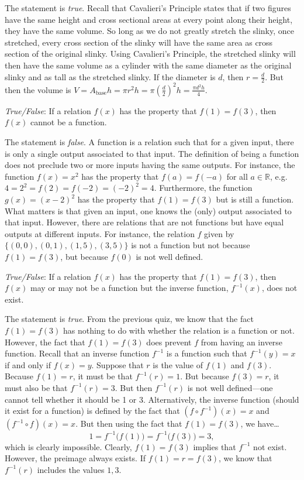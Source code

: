\documentclass[11pt,letterpaper]{article}
\begin{document}
\sol The statement is \textit{true}. Recall that Cavalieri's Principle states that if two figures have the same height and cross sectional areas at every point along their height, they have the same volume. So long as we do not greatly stretch the slinky, once stretched, every cross section of the slinky will have the same area as cross section of the original slinky. Using Cavalieri's Principle, the stretched slinky will then have the same volume as a cylinder with the same diameter as the original slinky and as tall as the stretched slinky. If the diameter is $d$, then $r= \frac{d}{2}$. But then the volume is $V= A_{\text{base}} h= \pi r^2h= \pi \left( \frac{d}{2} \right)^2 h= \frac{\pi d^2 h}{4}$. \pvspace{1.3cm}



\quizsol \textit{True/False}: If a relation $f(x)$ has the property that $f(1)= f(3)$, then $f(x)$ cannot be a function. \pspace

\sol The statement is \textit{false}. A function is a relation such that for a given input, there is only a single output associated to that input. The definition of being a function does not preclude two or more inputs having the same outputs. For instance, the function $f(x)= x^2$ has the property that $f(a)= f(-a)$ for all $a \in \mathbb{R}$, e.g. $4= 2^2= f(2)= f(-2)= (-2)^2= 4$. Furthermore, the function $g(x)= (x - 2)^2$ has the property that $f(1)= f(3)$ but is still a function. What matters is that given an input, one knows the (only) output associated to that input. However, there are relations that are not functions but have equal outputs at different inputs. For instance, the relation $f$ given by $\{ (0, 0), (0, 1), (1, 5), (3, 5) \}$ is not a function but not because $f(1)= f(3)$, but because $f(0)$ is not well defined. \pvspace{0.8cm}



\quizsol \textit{True/False}: If a relation $f(x)$ has the property that $f(1)= f(3)$, then $f(x)$ may or may not be a function but the inverse function, $f^{-1}(x)$, does not exist. \pspace

\sol The statement is \textit{true}. From the previous quiz, we know that the fact $f(1)= f(3)$ has nothing to do with whether the relation is a function or not. However, the fact that $f(1)= f(3)$ does prevent $f$ from having an inverse function. Recall that an inverse function $f^{-1}$ is a function such that $f^{-1}(y)= x$ if and only if $f(x)= y$. Suppose that $r$ is the value of $f(1)$ and $f(3)$. Because $f(1)= r$, it must be that $f^{-1}(r)= 1$. But because $f(3)= r$, it must also be that $f^{-1}(r)= 3$. But then $f^{-1}(r)$ is not well defined---one cannot tell whether it should be 1 or 3. Alternatively, the inverse function (should it exist for a function) is defined by the fact that $(f \circ f^{-1})(x)= x$ and $(f^{-1} \circ f)(x)= x$. But then using the fact that $f(1)= f(3)$, we have\dots
	\[
	1= f^{-1} \big( f(1) \big)= f^{-1} \big( f(3) \big)= 3,
	\]
which is clearly impossible. Clearly, $f(1)= f(3)$ implies that $f^{-1}$ not exist. However, the preimage always exists. If $f(1)= r = f(3)$, we know that $f^{-1}(r)$ includes the values $1, 3$. \pvspace{0.8cm}
\end{document}
